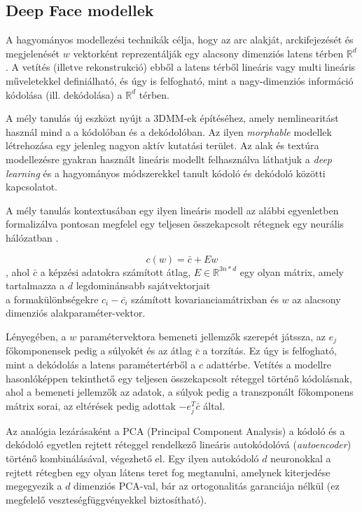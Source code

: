 \documentclass[12pt,a4]{article}
\begin{document}
	\newpage
	\subsection{Deep Face modellek}
	
	A hagyományos modellezési technikák célja, hogy
	az arc alakját, arckifejezését és megjelenését $w$ vektorként reprezentálják egy
	alacsony dimenziós latens térben $\mathbb{R}^d$ \cite{3dmm}. A vetítés (illetve rekonstrukció) ebből a latens térből lineáris vagy multi lineáris műveletekkel definiálható, és úgy is felfogható, mint a nagy-dimenziós információ kódolása (ill.
	dekódolása) a $\mathbb{R}^d$ térben.
	
	
	A mély tanulás új eszközt nyújt a 3DMM-ek építéséhez, amely nemlinearitást használ mind a
	a kódolóban és a dekódolóban. Az ilyen \textit{morphable} modellek létrehozása egy jelenleg nagyon aktív kutatási terület.
	Az alak és textúra modellezésre gyakran használt lineáris modellt felhasználva láthatjuk a \textit{deep learning} és a hagyományos módszerekkel tanult kódoló és dekódoló közötti kapcsolatot.
	
	
	A mély tanulás kontextusában egy ilyen lineáris modell
	az alábbi egyenletben formalizálva pontosan megfelel egy teljesen összekapcsolt rétegnek egy
	neurális hálózatban \cite{3dmm}.
	
	\begin{mdframed}
	\begin{equation}
		c(w) = \bar{c} + Ew 
	\end{equation}
		 , ahol $\bar{c}$ a képzési adatokra számított átlag, $E \in \mathbb{R}^{3n*d}$ egy olyan mátrix, amely tartalmazza a $d$ legdominánsabb sajátvektorjait \\
		  a formakülönbségekre $c_i - \bar{c_i}$ számított kovarianciamátrixban és
		$w$ az alacsony dimenziós alakparaméter-vektor.
	\end{mdframed}
	
	\cite{3dmm}Lényegében, a $w$ paramétervektora bemeneti jellemzők szerepét játssza, az $e_j$ főkomponensek pedig a súlyokét és az átlag $\bar{c}$ a torzítás.
	Ez úgy is felfogható, mint a dekódolás a latens paramétertérből a $c$ adattérbe. Vetítés a modellre
	hasonlóképpen tekinthető egy teljesen összekapcsolt réteggel történő kódolásnak,
	ahol a bemeneti jellemzők az adatok, a súlyok pedig a transzponált főkomponens mátrix sorai, az eltérések pedig adottak $-e^{T}_{j}\bar{c}$ által.
	
	
	 Az analógia lezárásaként a PCA (Principal Component Analysis) a kódoló és a dekódoló egyetlen rejtett réteggel rendelkező lineáris autokódolóvá (\textit{autoencoder}) történő kombinálásával, végezhető el.
	Egy ilyen autokódoló $d$ neuronokkal a
	rejtett rétegben egy olyan látens teret fog megtanulni, amelynek kiterjedése megegyezik a $d$
	dimenziós PCA-val, bár az ortogonalitás garanciája nélkül
	(ez megfelelő veszteségfüggvényekkel biztosítható).
	
\end{document}
